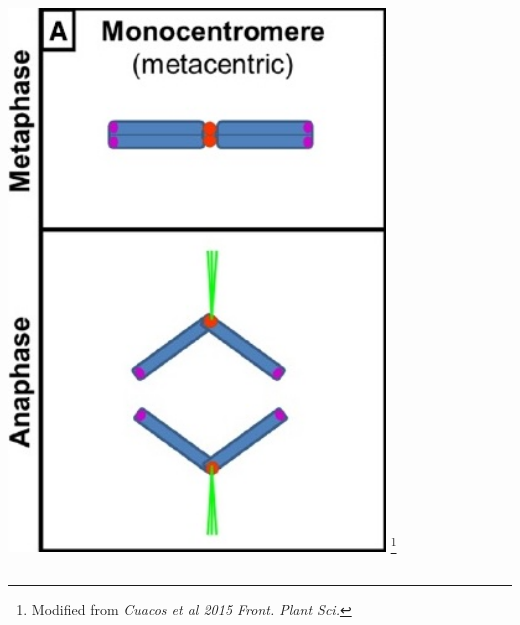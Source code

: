 \documentclass{beamer}
\newcommand\blfootnote[1]{%
	\begingroup
	\renewcommand\thefootnote{}\footnote{#1}%
	\addtocounter{footnote}{-1}%
	\endgroup
}
\begin{document}
\begin{frame}
\begin{columns}
\begin{column}{0.5\textwidth}
		\includegraphics[keepaspectratio, width  =0.75\textwidth]{img/centromeresInAction} \blfootnote{Modified from \textit{Cuacos et al 2015 Front. Plant Sci.} }
		\end{column}
		
\end{columns}

\end{frame}	
	
\end{document}
